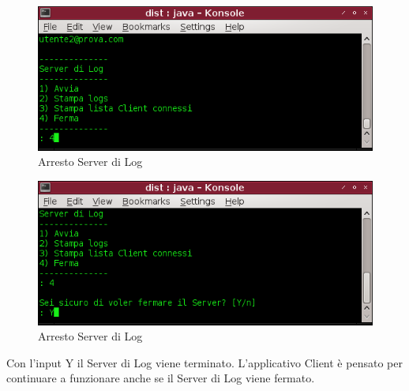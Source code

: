 \documentclass[a4paper, 11pt]{article} %
\begin{document}
\begin{center}
\begin{figure}[H]
\includegraphics[width=1.0\textwidth]{images/server_di_log-9.png}
\vspace{-0.6cm}
\caption{Arresto Server di Log}
\end{figure}
\end{center}
\begin{center}
\begin{figure}[H]
\includegraphics[width=1.0\textwidth]{images/server_di_log-10.png}
\vspace{-0.6cm}
\caption{Arresto Server di Log}
\end{figure}
\end{center}
\vspace{-1.0cm}
Con l'input Y il Server di Log viene terminato. L'applicativo Client \`e pensato per continuare a funzionare anche se il Server di Log viene fermato.
\end{document}

